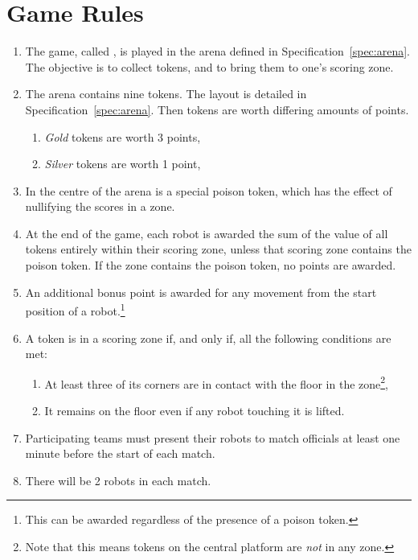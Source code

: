 \section{Game Rules}
\label{sec:rules}

\begin{enumerate}
  \item The game, called \emph{\gamename}, is played in the arena defined in
        Specification~\ref{spec:arena}. The objective is to collect tokens, and
        to bring them to one's scoring zone.
  \item The arena contains nine tokens. The layout is detailed in
        Specification~\ref{spec:arena}. Then tokens are worth differing amounts
        of points.
        \begin{enumerate}
          \item \emph{Gold} tokens are worth 3 points,
          \item \emph{Silver} tokens are worth 1 point,
        \end{enumerate}
  \item In the centre of the arena is a special poison token, which has the
        effect of nullifying the scores in a zone.
  \item At the end of the game, each robot is awarded the sum of the value of
        all tokens entirely within their scoring zone, unless that scoring zone
        contains the poison token. If the zone contains the poison token, no
        points are awarded.
  \item An additional bonus point is awarded for any movement from the
        start position of a robot.\footnote{This can be awarded regardless of
        the presence of a poison token.}
  \item A token is in a scoring zone if, and only if, all the following
        conditions are met:
        \begin{enumerate}
          \item At least three of its corners are in contact with the floor in
                the zone\footnote{Note that this means tokens on the central
                platform are \emph{not} in any zone.},
          \item It remains on the floor even if any robot touching it is lifted.
        \end{enumerate}
  \item Participating teams must present their robots to match officials at
        least one minute before the start of each match.
  \item There will be 2 robots in each match.

\end{enumerate}
